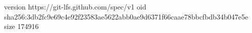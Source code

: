 version https://git-lfs.github.com/spec/v1
oid sha256:3db2fc9e69c4e92f23583ae5622abb0ae9d6371f66caae78bbcfbdb34b047e5e
size 174916
